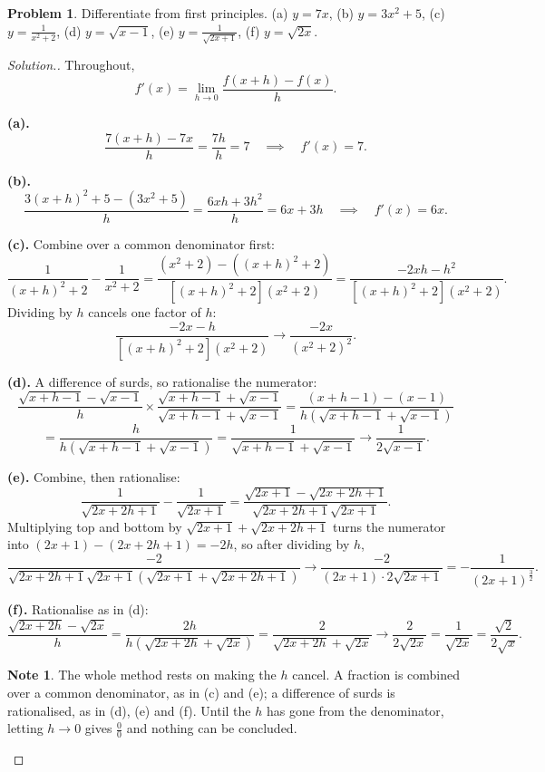 \documentclass[11pt,a4paper]{article}
\theoremstyle{definition}
\newtheorem{note}[thm]{Note}
\newtheorem{problemx}{Problem}[section]
\newenvironment{problem}{\begin{problemx}}{\end{problemx}}
\newenvironment{solution}
  {\renewcommand{\qedsymbol}{}\begin{proof}[\textit{Solution}.]}
  {\end{proof}}
\begin{document}
\begin{problem}
Differentiate from first principles.
\quad (a) $y=7x$, \quad (b) $y=3x^2+5$, \quad (c) $y=\frac{1}{x^2+2}$, \quad
(d) $y=\sqrt{x-1}$, \quad (e) $y=\frac{1}{\sqrt{2x+1}}$, \quad (f) $y=\sqrt{2x}$.
\end{problem}

\begin{solution}
Throughout,
$$f'(x)=\lim_{h\to 0}\frac{f(x+h)-f(x)}{h}.$$

\textbf{(a).}
$$\frac{7(x+h)-7x}{h}=\frac{7h}{h}=7\quad\implies\quad f'(x)=7.$$

\textbf{(b).}
$$\frac{3(x+h)^2+5-\left(3x^2+5\right)}{h}=\frac{6xh+3h^2}{h}=6x+3h
\quad\implies\quad f'(x)=6x.$$

\textbf{(c).} Combine over a common denominator first:
$$\frac{1}{(x+h)^2+2}-\frac{1}{x^2+2}
=\frac{\left(x^2+2\right)-\left((x+h)^2+2\right)}{\left[(x+h)^2+2\right]\left(x^2+2\right)}
=\frac{-2xh-h^2}{\left[(x+h)^2+2\right]\left(x^2+2\right)}.$$
Dividing by $h$ cancels one factor of $h$:
$$\frac{-2x-h}{\left[(x+h)^2+2\right]\left(x^2+2\right)}
\longrightarrow \frac{-2x}{\left(x^2+2\right)^2}.$$

\textbf{(d).} A difference of surds, so rationalise the numerator:
$$\frac{\sqrt{x+h-1}-\sqrt{x-1}}{h}
\times\frac{\sqrt{x+h-1}+\sqrt{x-1}}{\sqrt{x+h-1}+\sqrt{x-1}}
=\frac{(x+h-1)-(x-1)}{h\left(\sqrt{x+h-1}+\sqrt{x-1}\right)}$$
$$=\frac{h}{h\left(\sqrt{x+h-1}+\sqrt{x-1}\right)}
=\frac{1}{\sqrt{x+h-1}+\sqrt{x-1}}\longrightarrow\frac{1}{2\sqrt{x-1}}.$$

\textbf{(e).} Combine, then rationalise:
$$\frac{1}{\sqrt{2x+2h+1}}-\frac{1}{\sqrt{2x+1}}
=\frac{\sqrt{2x+1}-\sqrt{2x+2h+1}}{\sqrt{2x+2h+1}\sqrt{2x+1}}.$$
Multiplying top and bottom by $\sqrt{2x+1}+\sqrt{2x+2h+1}$ turns the numerator into
$(2x+1)-(2x+2h+1)=-2h$, so after dividing by $h$,
$$\frac{-2}{\sqrt{2x+2h+1}\sqrt{2x+1}\left(\sqrt{2x+1}+\sqrt{2x+2h+1}\right)}
\longrightarrow\frac{-2}{(2x+1)\cdot 2\sqrt{2x+1}}=-\frac{1}{(2x+1)^{\frac{3}{2}}}.$$

\textbf{(f).} Rationalise as in (d):
$$\frac{\sqrt{2x+2h}-\sqrt{2x}}{h}=\frac{2h}{h\left(\sqrt{2x+2h}+\sqrt{2x}\right)}
=\frac{2}{\sqrt{2x+2h}+\sqrt{2x}}\longrightarrow\frac{2}{2\sqrt{2x}}
=\frac{1}{\sqrt{2x}}=\frac{\sqrt{2}}{2\sqrt{x}}.$$

\begin{note}
The whole method rests on making the $h$ cancel. A fraction is combined over a common
denominator, as in (c) and (e); a difference of surds is rationalised, as in (d), (e)
and (f). Until the $h$ has gone from the denominator, letting $h\to 0$ gives
$\frac{0}{0}$ and nothing can be concluded.
\end{note}
\end{solution}
\end{document}
